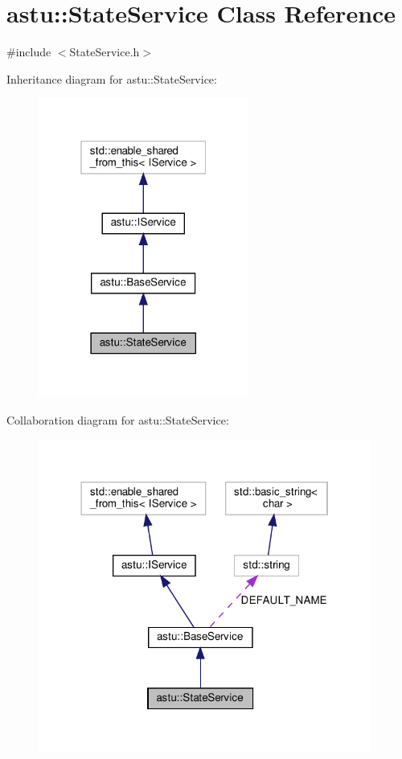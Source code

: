 \hypertarget{classastu_1_1StateService}{}\section{astu\+:\+:State\+Service Class Reference}
\label{classastu_1_1StateService}


{\ttfamily \#include $<$State\+Service.\+h$>$}



Inheritance diagram for astu\+:\+:State\+Service\+:\nopagebreak
\begin{figure}[H]
\begin{center}
\leavevmode
\includegraphics[width=196pt]{classastu_1_1StateService__inherit__graph}
\end{center}
\end{figure}


Collaboration diagram for astu\+:\+:State\+Service\+:\nopagebreak
\begin{figure}[H]
\begin{center}
\leavevmode
\includegraphics[width=310pt]{classastu_1_1StateService__coll__graph}
\end{center}
\end{figure}

